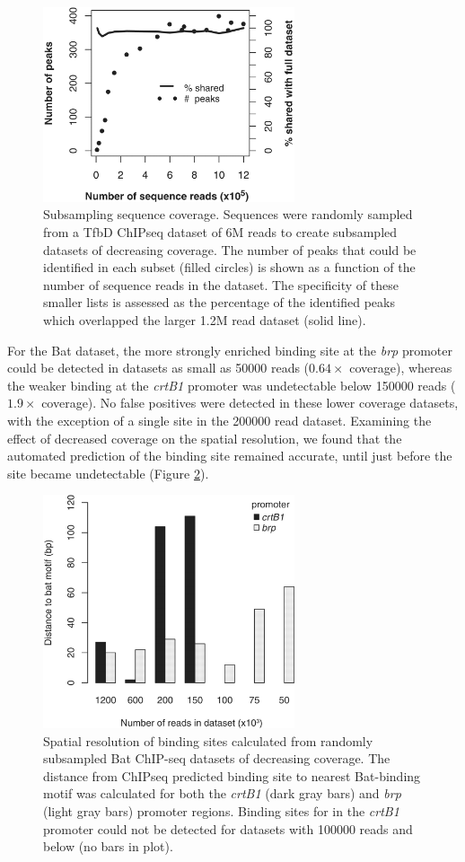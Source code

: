 \begin{figure}
\centering
\includegraphics[width=20em]{SaltyBugs/figures/fig7}
\caption{Subsampling sequence coverage. Sequences were randomly sampled from a TfbD ChIPseq dataset of 6M reads to create subsampled datasets of decreasing coverage. The number of peaks that could be identified in each subset (filled circles) is shown as a function of the number of sequence reads in the dataset. The specificity of these smaller lists is assessed as the percentage of the identified peaks which overlapped the larger 1.2M read dataset (solid line).}
\label{SB_fig7}
\end{figure}

For the Bat dataset, the more strongly enriched binding site at the {\em brp} promoter could be detected in datasets as small as 50000 reads ($0.64\times$ coverage), whereas the weaker binding at the {\em crtB1} promoter was undetectable below 150000 reads ($1.9\times$ coverage). No false positives were detected in these lower coverage datasets, with the exception of a single site in the 200000 read dataset. Examining the effect of decreased coverage on the spatial resolution, we found that the automated prediction of the binding site remained accurate, until just before the site became undetectable (Figure \ref{SB_fig8}).


\begin{figure}
\centering
\includegraphics[width=20em]{SaltyBugs/figures/fig8}
\caption{Spatial resolution of binding sites calculated from randomly subsampled Bat ChIP-seq datasets of decreasing coverage. The distance from ChIPseq predicted binding site to nearest Bat-binding motif was calculated for both the {\em crtB1} (dark gray bars) and {\em brp} (light gray bars) promoter regions. Binding sites for in the {\em crtB1} promoter could not be detected for datasets with 100000 reads and below (no bars in plot).}
\label{SB_fig8}
\end{figure}